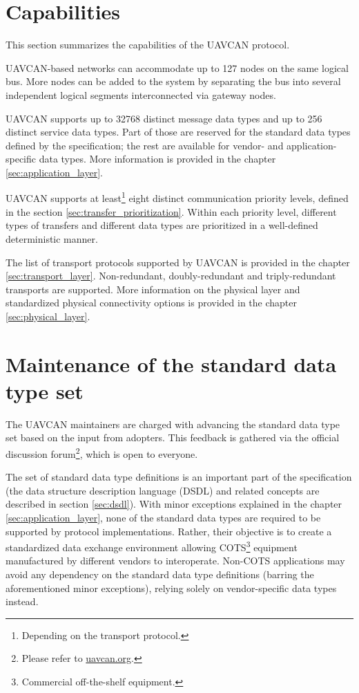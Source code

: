 \section{Capabilities}

This section summarizes the capabilities of the UAVCAN protocol.

UAVCAN-based networks can accommodate up to 127 nodes on the same logical bus.
More nodes can be added to the system by separating the bus into several independent logical segments
interconnected via gateway nodes.

UAVCAN supports up to 32768 distinct message data types and up to 256 distinct service data types.
Part of those are reserved for the standard data types defined by the specification;
the rest are available for vendor- and application-specific data types.
More information is provided in the chapter \ref{sec:application_layer}.

UAVCAN supports at least\footnote{Depending on the transport protocol.} eight distinct communication priority levels,
defined in the section \ref{sec:transfer_prioritization}.
Within each priority level, different types of transfers and different data types are
prioritized in a well-defined deterministic manner.

The list of transport protocols supported by UAVCAN is provided in the chapter \ref{sec:transport_layer}.
Non-redundant, doubly-redundant and triply-redundant transports are supported.
More information on the physical layer and standardized physical connectivity options
is provided in the chapter \ref{sec:physical_layer}.

\section{Maintenance of the standard data type set}

The UAVCAN maintainers are charged with advancing the standard data type set based on the input from adopters.
This feedback is gathered via the official discussion
forum\footnote{Please refer to \href{http://uavcan.org}{uavcan.org}.},
which is open to everyone.

The set of standard data type definitions is an important part of the specification
(the data structure description language (DSDL) and related concepts are described in section \ref{sec:dsdl}).
With minor exceptions explained in the chapter \ref{sec:application_layer},
none of the standard data types are required to be supported by protocol implementations.
Rather, their objective is to create a standardized data exchange environment
allowing COTS\footnote{Commercial off-the-shelf equipment.} equipment manufactured by different vendors to
interoperate.
Non-COTS applications may avoid any dependency on the standard data type definitions (barring the aforementioned
minor exceptions), relying solely on vendor-specific data types instead.

